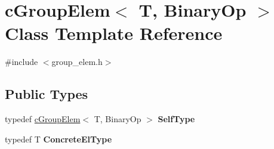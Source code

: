 \hypertarget{classcGroupElem}{\section{c\-Group\-Elem$<$ \-T, \-Binary\-Op $>$ \-Class \-Template \-Reference}
\label{classcGroupElem}
}


{\ttfamily \#include $<$group\-\_\-elem.\-h$>$}

\subsection*{\-Public \-Types}
\begin{DoxyCompactItemize}
\item 
\hypertarget{classcGroupElem_a59d8e25f570c976b3c7f13756ada8dc4}{typedef \hyperlink{classcGroupElem}{c\-Group\-Elem}$<$ \-T, \-Binary\-Op $>$ {\bfseries \-Self\-Type}}\label{classcGroupElem_a59d8e25f570c976b3c7f13756ada8dc4}

\item 
\hypertarget{classcGroupElem_a49af5748a3d451f2256fb82266338bca}{typedef \-T {\bfseries \-Concrete\-El\-Type}}\label{classcGroupElem_a49af5748a3d451f2256fb82266338bca}

\end{DoxyCompactItemize}
